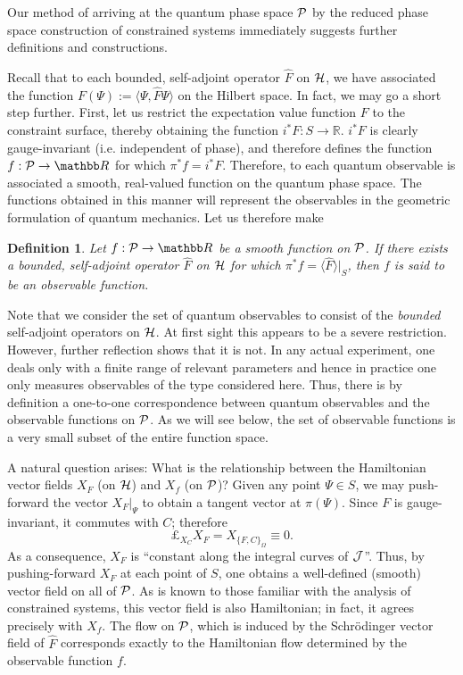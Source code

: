 \documentclass[12pt,aps,eqsecnum,tighten,nofootinbib]{revtex4-2}
\newtheorem{definition}{Definition}[section]
\def\<{\langle}
\def\>{\rangle}
\def\H{{\cal H}}
\def\P{{\cal P}}
\def\W{\Omega}
\def\J{{\cal J}}
\newcommand{\lie}[1]{{\pounds}_{#1}}
\newcommand{\hvf}[1]{{X_{#1}}}
\def\R{\mathbb R}
\begin{document}
Our method of arriving at the quantum phase space $\P$ by the reduced
phase space construction of constrained systems immediately suggests
further definitions and constructions.

Recall that to each bounded, self-adjoint operator $\hat{F}$ on $\H$,
we have associated the function $F(\Psi) := \< \Psi, \hat{F} \Psi \>$
on the Hilbert space.  In fact, we may go a short step further.
First, let us restrict the expectation value function $F$ to the
constraint surface, thereby obtaining the function $i^*F : S
\rightarrow \R$.  $i^*F$ is clearly gauge-invariant (i.e. independent
of phase), and therefore defines the function $f: \P \rightarrow \R$
for which $\pi^*f = i^*F$.  Therefore, to each quantum observable is
associated a smooth, real-valued function on the quantum phase space.
The functions obtained in this manner will represent the observables
in the geometric formulation of quantum mechanics. Let us therefore
make
%
\begin{definition} \label{defn_observable_fn}
Let $f: \P \rightarrow \R$ be a smooth function on $\P$.  If there
exists a bounded, self-adjoint operator $\hat{F}$ on $\H$ for which
$\pi^*f = \< \hat{F} \>\big|_S$, then $f$ is said to be an {\em
observable function}.
\end{definition}
\noindent
Note that we consider the set of quantum observables to consist of the
{\em bounded} self-adjoint operators on $\H$. At first sight this
appears to be a severe restriction. However, further reflection shows
that it is not. In any actual experiment, one deals only with a finite
range of relevant parameters and hence in practice one only measures
observables of the type considered here.  Thus, there is by definition
a one-to-one correspondence between quantum observables and the
observable functions on $\P$.  As we will see below, the set of
observable functions is a very small subset of the entire function
space.

A natural question arises: What is the relationship between the
Hamiltonian vector fields $\hvf{F}$ (on $\H$) and $\hvf{f}$ (on $\P$)?
Given any point $\Psi \in S$, we may push-forward the vector
$\hvf{F}\big|_\Psi$ to obtain a tangent vector at $\pi(\Psi)$.  Since
$F$ is gauge-invariant, it commutes with $C$; therefore
%
\[	\lie{\hvf{C}} \hvf{F} = \hvf{ \{ F, C\}_\W} \equiv 0.	\]
%
As a consequence, $\hvf{F}$ is ``constant along the integral curves of
$\J$''.  Thus, by pushing-forward $\hvf{F}$ at each point of $S$, one
obtains a well-defined (smooth) vector field on all of $\P$.  As is
known to those familiar with the analysis of constrained systems, this
vector field is also Hamiltonian; in fact, it agrees precisely with
$\hvf{f}$.  The flow on $\P$, which is induced by the Schr\"odinger
vector field of $\hat{F}$ corresponds exactly to the Hamiltonian flow
determined by the observable function $f$.
\end{document}
